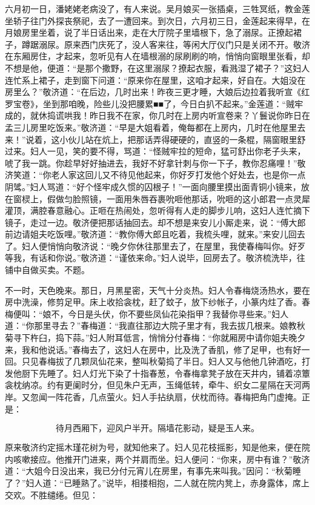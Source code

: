 六月初一日，潘姥姥老病没了，有人来说。吴月娘买一张插桌，三牲冥纸，教金莲坐轿子往门外探丧祭祀，去了一遭回来。到次日，六月初三日，金莲起来得早，在月娘房里坐着，说了半日话出来，走在大厅院子里墙根下，急了溺尿。正撩起裙子，蹲踞溺尿。原来西门庆死了，没人客来往，等闲大厅仪门只是关闭不开。敬济在东厢房住，才起来，忽听见有人在墙根溺的尿刷刷的响，悄悄向窗眼里张看，却不想是他，便道：“是那个撒野，在这里溺尿？撩起衣服，看溅湿了裙子？”这妇人连忙系上裙子，走到窗下问道：“原来你在屋里，这咱才起来，好自在。大姐没在房里么？”敬济道：“在后边，几时出来！昨夜三更才睡，大娘后边拉着我听宣《红罗宝卷》，坐到那咱晚，险些儿没把腰累■■了，今日白扒不起来。”金莲道：“贼牢成的，就休捣谎哄我！昨日我不在家，你几时在上房内听宣卷来？丫鬟说你昨日在孟三儿房里吃饭来。”敬济道：“早是大姐看着，俺每都在上房内，几时在他屋里去来！”说着，这小伙儿站在炕上，把那话弄得硬硬的，直竖的一条棍，隔窗眼里舒过来。妇人一见，笑的要不得，骂道：“怪贼牢拉的短命，猛可舒出你老子头来，唬了我一跳。你趁早好好抽进去，我好不好拿针刺与你一下子，教你忍痛哩！”敬济笑道：“你老人家这回儿又不待见他起来，你好歹打发他个好处去，也是你一点阴骘。”妇人骂道：“好个怪牢成久惯的囚根子！”一面向腰里摸出面青铜小镜来，放在窗棂上，假做匀脸照镜，一面用朱唇吞裹吮咂他那话，吮咂的这小郎君一点灵犀灌顶，满腔春意融心。正咂在热闹处，忽听得有人走的脚步儿响，这妇人连忙摘下镜子，走过一边。敬济便把那话抽回去。却不想是来安儿小厮走来，说：“傅大郎前边请姐夫吃饭哩。”敬济道：“教你傅大郎且吃着，我梳头哩，就来。”来安儿回去了。妇人便悄悄向敬济说：“晚夕你休往那里去了，在屋里，我使春梅叫你。好歹等我，有话和你说。”敬济道：“谨依来命。”妇人说毕，回房去了。敬济梳洗毕，往铺中自做买卖。不题。

不一时，天色晚来。那日，月黑星密，天气十分炎热。妇人令春梅烧汤热水，要在房中洗澡，修剪足甲。床上收拾衾枕，赶了蚊子，放下纱帐子，小篆内炷了香。春梅便叫：“娘不，今日是头伏，你不要些凤仙花染指甲？我替你寻些来。”妇人道：“你那里寻去？”春梅道：“我直往那边大院子里才有，我去拔几根来。娘教秋菊寻下杵臼，捣下蒜。”妇人附耳低言，悄悄分付春梅：“你就厢房中请你姐夫晚夕来，我和他说话。”春梅去了，这妇人在房中，比及洗了香肌，修了足甲，也有好一回。只见春梅拔了几颗凤仙花来，整叫秋菊捣了半日。妇人又与他他几钟酒吃，打发他厨下先睡了。妇人灯光下染了十指春葱，令春梅拿凳子放在天井内，铺着凉簟衾枕纳凉。约有更阑时分，但见朱户无声，玉绳低转，牵牛、织女二星隔在天河两岸。又忽闻一阵花香，几点萤火。妇人手拈纨扇，伏枕而待。春梅把角门虚掩。正是：

\[
待月西厢下，迎风户半开。
隔墙花影动，疑是玉人来。
\]

原来敬济约定摇木瑾花树为号，就知他来了。妇人见花枝摇影，知是他来，便在院内咳嗽接应。他推开门进来，两个并肩而坐。妇人便问：“你来，房中有谁？”敬济道：“大姐今日没出来，我已分付元宵儿在房里，有事先来叫我。”因问：“秋菊睡了？”妇人道：“已睡熟了。”说毕，相搂相抱，二人就在院内凳上，赤身露体，席上交欢。不胜缱绻。但见：

